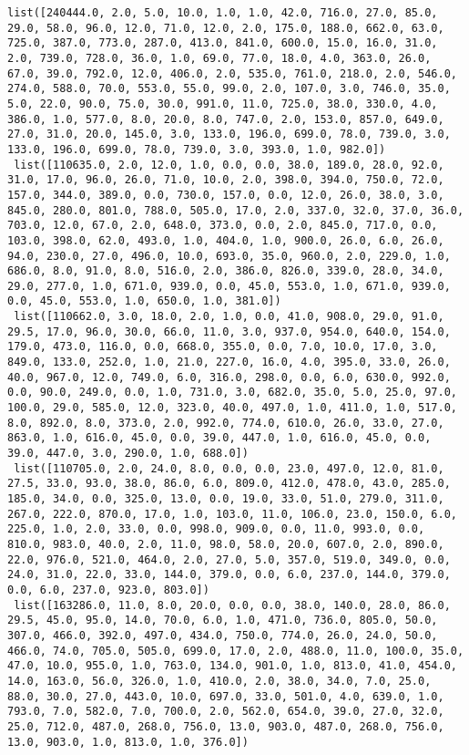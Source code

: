\documentclass[11pt]{article}
\begin{document}
\begin{Verbatim}[commandchars=\\\{\}]
 list([240444.0, 2.0, 5.0, 10.0, 1.0, 1.0, 42.0, 716.0, 27.0, 85.0, 29.0, 58.0, 96.0, 12.0, 71.0, 12.0, 2.0, 175.0, 188.0, 662.0, 63.0, 725.0, 387.0, 773.0, 287.0, 413.0, 841.0, 600.0, 15.0, 16.0, 31.0, 2.0, 739.0, 728.0, 36.0, 1.0, 69.0, 77.0, 18.0, 4.0, 363.0, 26.0, 67.0, 39.0, 792.0, 12.0, 406.0, 2.0, 535.0, 761.0, 218.0, 2.0, 546.0, 274.0, 588.0, 70.0, 553.0, 55.0, 99.0, 2.0, 107.0, 3.0, 746.0, 35.0, 5.0, 22.0, 90.0, 75.0, 30.0, 991.0, 11.0, 725.0, 38.0, 330.0, 4.0, 386.0, 1.0, 577.0, 8.0, 20.0, 8.0, 747.0, 2.0, 153.0, 857.0, 649.0, 27.0, 31.0, 20.0, 145.0, 3.0, 133.0, 196.0, 699.0, 78.0, 739.0, 3.0, 133.0, 196.0, 699.0, 78.0, 739.0, 3.0, 393.0, 1.0, 982.0])
 list([110635.0, 2.0, 12.0, 1.0, 0.0, 0.0, 38.0, 189.0, 28.0, 92.0, 31.0, 17.0, 96.0, 26.0, 71.0, 10.0, 2.0, 398.0, 394.0, 750.0, 72.0, 157.0, 344.0, 389.0, 0.0, 730.0, 157.0, 0.0, 12.0, 26.0, 38.0, 3.0, 845.0, 280.0, 801.0, 788.0, 505.0, 17.0, 2.0, 337.0, 32.0, 37.0, 36.0, 703.0, 12.0, 67.0, 2.0, 648.0, 373.0, 0.0, 2.0, 845.0, 717.0, 0.0, 103.0, 398.0, 62.0, 493.0, 1.0, 404.0, 1.0, 900.0, 26.0, 6.0, 26.0, 94.0, 230.0, 27.0, 496.0, 10.0, 693.0, 35.0, 960.0, 2.0, 229.0, 1.0, 686.0, 8.0, 91.0, 8.0, 516.0, 2.0, 386.0, 826.0, 339.0, 28.0, 34.0, 29.0, 277.0, 1.0, 671.0, 939.0, 0.0, 45.0, 553.0, 1.0, 671.0, 939.0, 0.0, 45.0, 553.0, 1.0, 650.0, 1.0, 381.0])
 list([110662.0, 3.0, 18.0, 2.0, 1.0, 0.0, 41.0, 908.0, 29.0, 91.0, 29.5, 17.0, 96.0, 30.0, 66.0, 11.0, 3.0, 937.0, 954.0, 640.0, 154.0, 179.0, 473.0, 116.0, 0.0, 668.0, 355.0, 0.0, 7.0, 10.0, 17.0, 3.0, 849.0, 133.0, 252.0, 1.0, 21.0, 227.0, 16.0, 4.0, 395.0, 33.0, 26.0, 40.0, 967.0, 12.0, 749.0, 6.0, 316.0, 298.0, 0.0, 6.0, 630.0, 992.0, 0.0, 90.0, 249.0, 0.0, 1.0, 731.0, 3.0, 682.0, 35.0, 5.0, 25.0, 97.0, 100.0, 29.0, 585.0, 12.0, 323.0, 40.0, 497.0, 1.0, 411.0, 1.0, 517.0, 8.0, 892.0, 8.0, 373.0, 2.0, 992.0, 774.0, 610.0, 26.0, 33.0, 27.0, 863.0, 1.0, 616.0, 45.0, 0.0, 39.0, 447.0, 1.0, 616.0, 45.0, 0.0, 39.0, 447.0, 3.0, 290.0, 1.0, 688.0])
 list([110705.0, 2.0, 24.0, 8.0, 0.0, 0.0, 23.0, 497.0, 12.0, 81.0, 27.5, 33.0, 93.0, 38.0, 86.0, 6.0, 809.0, 412.0, 478.0, 43.0, 285.0, 185.0, 34.0, 0.0, 325.0, 13.0, 0.0, 19.0, 33.0, 51.0, 279.0, 311.0, 267.0, 222.0, 870.0, 17.0, 1.0, 103.0, 11.0, 106.0, 23.0, 150.0, 6.0, 225.0, 1.0, 2.0, 33.0, 0.0, 998.0, 909.0, 0.0, 11.0, 993.0, 0.0, 810.0, 983.0, 40.0, 2.0, 11.0, 98.0, 58.0, 20.0, 607.0, 2.0, 890.0, 22.0, 976.0, 521.0, 464.0, 2.0, 27.0, 5.0, 357.0, 519.0, 349.0, 0.0, 24.0, 31.0, 22.0, 33.0, 144.0, 379.0, 0.0, 6.0, 237.0, 144.0, 379.0, 0.0, 6.0, 237.0, 923.0, 803.0])
 list([163286.0, 11.0, 8.0, 20.0, 0.0, 0.0, 38.0, 140.0, 28.0, 86.0, 29.5, 45.0, 95.0, 14.0, 70.0, 6.0, 1.0, 471.0, 736.0, 805.0, 50.0, 307.0, 466.0, 392.0, 497.0, 434.0, 750.0, 774.0, 26.0, 24.0, 50.0, 466.0, 74.0, 705.0, 505.0, 699.0, 17.0, 2.0, 488.0, 11.0, 100.0, 35.0, 47.0, 10.0, 955.0, 1.0, 763.0, 134.0, 901.0, 1.0, 813.0, 41.0, 454.0, 14.0, 163.0, 56.0, 326.0, 1.0, 410.0, 2.0, 38.0, 34.0, 7.0, 25.0, 88.0, 30.0, 27.0, 443.0, 10.0, 697.0, 33.0, 501.0, 4.0, 639.0, 1.0, 793.0, 7.0, 582.0, 7.0, 700.0, 2.0, 562.0, 654.0, 39.0, 27.0, 32.0, 25.0, 712.0, 487.0, 268.0, 756.0, 13.0, 903.0, 487.0, 268.0, 756.0, 13.0, 903.0, 1.0, 813.0, 1.0, 376.0])

\end{Verbatim}
\end{document}
